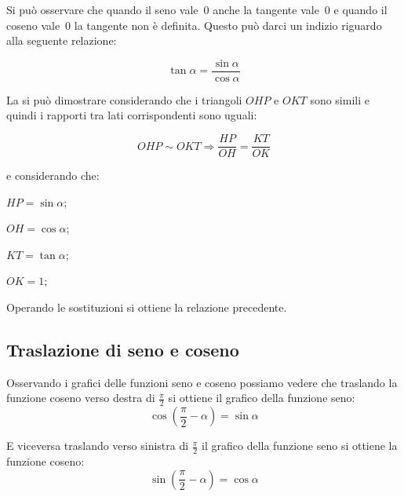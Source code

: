 Si può osservare che quando il seno vale~0 anche la tangente vale~0 e quando 
il coseno vale~0 la tangente non è definita. Questo può darci un indizio 
riguardo alla seguente relazione:

\[\tan \alpha = \frac{\sin \alpha}{\cos \alpha}\]

La si può dimostrare considerando che i triangoli \(OHP\) e \(OKT\) sono simili
e quindi i rapporti tra lati corrispondenti sono uguali:

\[OHP \sim OKT \Rightarrow \frac{HP}{OH} = \frac{KT}{OK}\]

\begin{minipage}{.3\textwidth}
e considerando che:
\begin{itemize*}
 \item \(HP = \sin \alpha\);
 \item \(OH = \cos \alpha\);
 \item \(KT = \tan \alpha\);
 \item \(OK = 1\);
\end{itemize*}
Operando le sostituzioni si ottiene la relazione precedente.
\end{minipage}
\begin{minipage}{.6\textwidth}
\begin{center}
 
\end{center}
\end{minipage}

\subsection{Traslazione di seno e coseno}

Osservando i grafici delle funzioni seno e coseno possiamo vedere che 
traslando
la funzione coseno verso destra di \(\frac{\pi}{2}\) si ottiene il grafico 
della 
funzione seno:
\[\cos\left(\frac{\pi}{2}-\alpha\right)=\sin\alpha\]
\vspace{-6pt}
  \begin{center}
\begin{inaccessibleblock}
    
\end{inaccessibleblock}
  \end{center}
\vspace{-6pt}
E viceversa traslando verso sinistra di \(\frac{\pi}{2}\) il grafico della 
funzione seno si ottiene la funzione coseno:
\[\sin\left(\frac{\pi}{2}-\alpha\right)=\cos\alpha\]

